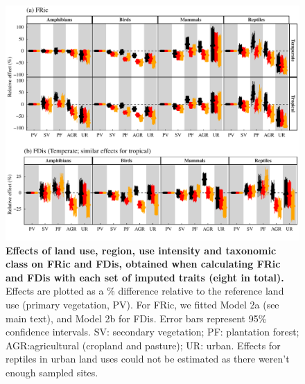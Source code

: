 \begin{figure}[h!]
\centering
\includegraphics[scale=0.7]{Supporting/Chapter3/Figures/Figure_SI_23}
\caption[Effects of land use, region, use intensity and taxonomic class on FRic and FDis, obtained when calculating FRic and FDis with each set of imputed traits]{\textbf{Effects of land use, region, use intensity and taxonomic class on FRic and FDis, obtained when calculating FRic and FDis with each set of imputed traits (eight in total).} Effects are plotted as a \% difference relative to the reference land use (primary vegetation, PV). For FRic, we fitted Model 2a (see main text), and Model 2b for FDis. Error bars represent 95\% confidence intervals. SV: secondary vegetation; PF: plantation forest; AGR:agricultural (cropland and pasture); UR: urban. Effects for reptiles in urban land uses could not be estimated as there weren’t enough sampled sites.}
\label{}
\end{figure}


